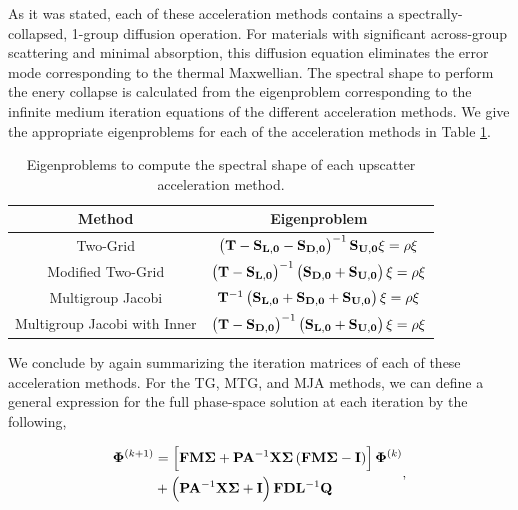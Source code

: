 As it was stated, each of these acceleration methods contains a spectrally-collapsed, 1-group diffusion operation. For materials with significant across-group scattering and minimal absorption, this diffusion equation eliminates the error mode corresponding to the thermal Maxwellian. The spectral shape to perform the enery collapse is calculated from the eigenproblem corresponding to the infinite medium iteration equations of the different acceleration methods. We give the appropriate eigenproblems for each of the acceleration methods in Table \ref{tab::DSA_DSA_MG_Summary_diffterms}.

\begin{table}
\centering
\caption{Eigenproblems to compute the spectral shape of each upscatter acceleration method.}
\def\arraystretch{1.5}
\begin{tabular}{|c|c|} \hline
Method &  Eigenproblem \\ \hline \hline
Two-Grid & $\left(  {\bf T} - {\bf S_{L,0}} - {\bf S_{D,0}} \right)^{-1} {\bf S_{U,0}} \xi = \rho \xi$ \\ \hline
Modified Two-Grid & $\left(  {\bf T} - {\bf S_{L,0}}  \right)^{-1} \left( {\bf S_{D,0}}+ {\bf S_{U,0}} \right)\xi = \rho \xi $ \\ \hline
Multigroup Jacobi &${\bf T}^{-1} \left( {\bf S_{L,0}}+{\bf S_{D,0}} +  {\bf S_{U,0}} \right)\xi = \rho \xi$   \\ \hline
Multigroup Jacobi with Inner & $\left(  {\bf T} - {\bf S_{D,0}} \right)^{-1} \left( {\bf S_{L,0}} +  {\bf S_{U,0}} \right)\xi = \rho \xi$ \\ \hline
\end{tabular}
\label{tab::DSA_DSA_MG_Summary_diffterms}
\end{table}

We conclude by again summarizing the iteration matrices of each of these acceleration methods. For the TG, MTG, and MJA methods, we can define a general expression for the full phase-space solution at each iteration by the following,

\begin{equation}
\label{eq::DSA_MG_Summary_form}
\begin{aligned}
{\bf \Phi}^{(k+1)} &= \left[ {\bf F} {\bf M} {\bf \Sigma} + {\bf P} {\bf A}^{-1}  {\bf X} {\bf \Sigma} \left(  {\bf F} {\bf M} {\bf \Sigma} - {\bf I} \right)  \right]   {\bf \Phi}^{(k)} \\
&+ \left(  {\bf P} {\bf A}^{-1}  {\bf X} {\bf \Sigma}  + {\bf I} \right) {\bf F} {\bf D}{\bf L}^{-1}  {\bf Q}
\end{aligned} ,
\end{equation}

